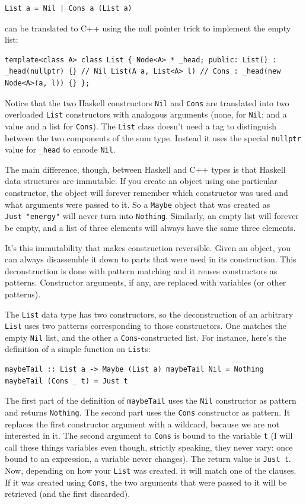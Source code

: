 \begin{verbatim}
List a = Nil | Cons a (List a)
\end{verbatim}

can be translated to C++ using the null pointer trick to implement the
empty list:

\begin{verbatim}
template<class A> class List { Node<A> * _head; public: List() : _head(nullptr) {} // Nil List(A a, List<A> l) // Cons : _head(new Node<A>(a, l)) {} };
\end{verbatim}

Notice that the two Haskell constructors \texttt{Nil} and \texttt{Cons}
are translated into two overloaded \texttt{List} constructors with
analogous arguments (none, for \texttt{Nil}; and a value and a list for
\texttt{Cons}). The \texttt{List} class doesn't need a tag to
distinguish between the two components of the sum type. Instead it uses
the special \texttt{nullptr} value for \texttt{\_head} to encode
\texttt{Nil}.

The main difference, though, between Haskell and C++ types is that
Haskell data structures are immutable. If you create an object using one
particular constructor, the object will forever remember which
constructor was used and what arguments were passed to it. So a
\texttt{Maybe} object that was created as \texttt{Just\ "energy"} will
never turn into \texttt{Nothing}. Similarly, an empty list will forever
be empty, and a list of three elements will always have the same three
elements.

It's this immutability that makes construction reversible. Given an
object, you can always disassemble it down to parts that were used in
its construction. This deconstruction is done with pattern matching and
it reuses constructors as patterns. Constructor arguments, if any, are
replaced with variables (or other patterns).

The \texttt{List} data type has two constructors, so the deconstruction
of an arbitrary \texttt{List} uses two patterns corresponding to those
constructors. One matches the empty \texttt{Nil} list, and the other a
\texttt{Cons}-constructed list. For instance, here's the definition of a
simple function on \texttt{List}s:

\begin{verbatim}
maybeTail :: List a -> Maybe (List a) maybeTail Nil = Nothing maybeTail (Cons _ t) = Just t
\end{verbatim}

The first part of the definition of \texttt{maybeTail} uses the
\texttt{Nil} constructor as pattern and returns \texttt{Nothing}. The
second part uses the \texttt{Cons} constructor as pattern. It replaces
the first constructor argument with a wildcard, because we are not
interested in it. The second argument to \texttt{Cons} is bound to the
variable \texttt{t} (I will call these things variables even though,
strictly speaking, they never vary: once bound to an expression, a
variable never changes). The return value is \texttt{Just\ t}. Now,
depending on how your \texttt{List} was created, it will match one of
the clauses. If it was created using \texttt{Cons}, the two arguments
that were passed to it will be retrieved (and the first discarded).

